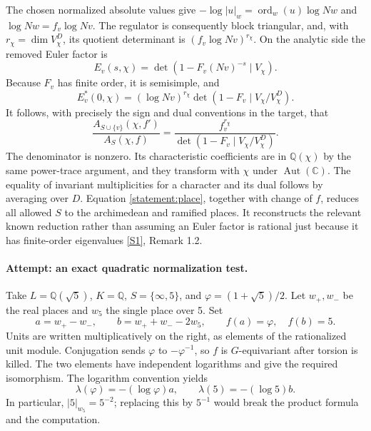 \documentclass[11pt,a4paper]{article}
\newcommand{\Q}{\mathbb{Q}}
\newcommand{\C}{\mathbb{C}}
\newcommand{\sref}[2]{\hyperlink{source:#1:#2}{[S#2]}}
\numberwithin{equation}{section}
\begin{document}
The chosen normalized absolute values give
$-\log|u|_w=\operatorname{ord}_w(u)\log Nw$ and
$\log Nw=f_v\log Nv$. The regulator is consequently block triangular,
and, with $r_\chi=\dim V_\chi^D$, its quotient determinant is
$(f_v\log Nv)^{r_\chi}$. On the analytic side the removed Euler factor is
\begin{equation}
 E_v(s,\chi)=\det(1-F_v(Nv)^{-s}\mid V_\chi).
\end{equation}
Because $F_v$ has finite order, it is semisimple, and
\begin{equation}
 E_v^*(0,\chi)=(\log Nv)^{r_\chi}
  \det(1-F_v\mid V_\chi/V_\chi^D).
\end{equation}
It follows, with precisely the sign and dual conventions in the target,
that
\begin{equation}\label{statement:place}
 \frac{A_{S\cup\{v\}}(\chi,f')}{A_S(\chi,f)}
 =\frac{f_v^{r_\chi}}
 {\det(1-F_v\mid V_\chi/V_\chi^D)}.
\end{equation}
The denominator is nonzero. Its characteristic coefficients are in
$\Q(\chi)$ by the same power-trace argument, and they transform with
$\chi$ under $\operatorname{Aut}(\C)$. The equality of invariant
multiplicities for a character and its dual follows by averaging over
$D$. Equation \eqref{statement:place}, together with change of $f$, reduces
all allowed $S$ to the archimedean and ramified places. It reconstructs
the relevant known reduction rather than assuming an Euler factor is
rational just because it has finite-order eigenvalues
\sref{statement}{1}, Remark 1.2.

\paragraph{Attempt: an exact quadratic normalization test.}
Take $L=\Q(\sqrt5)$, $K=\Q$, $S=\{\infty,5\}$, and
$\varphi=(1+\sqrt5)/2$. Let $w_+,w_-$ be the real places and $w_5$ the
single place over 5. Set
\begin{equation}
 a=w_+-w_-,\qquad b=w_++w_--2w_5,
 \qquad f(a)=\varphi,\quad f(b)=5.
\end{equation}
Units are written multiplicatively on the right, as elements of the
rationalized unit module. Conjugation sends $\varphi$ to
$-\varphi^{-1}$, so $f$ is $G$-equivariant after torsion is killed.
The two elements have independent logarithms and give the required
isomorphism. The logarithm convention yields
\begin{equation}
 \lambda(\varphi)=-(\log\varphi)a,\qquad
 \lambda(5)=-(\log5)b.
\end{equation}
In particular, $|5|_{w_5}=5^{-2}$; replacing this by $5^{-1}$ would
break the product formula and the computation.
\end{document}
